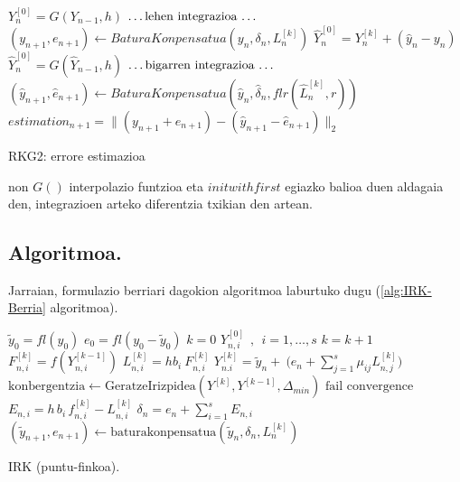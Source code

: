 \begin{algorithm}[H]
  \BlankLine
  {
    \BlankLine
    $Y_n^{[0]}=G(Y_{n-1},h)$\;
    \BlankLine
    $\text{\dots lehen integrazioa \dots}$\;
	\BlankLine
    $(y_{n+1},e_{n+1})\leftarrow BaturaKonpensatua(y_n,\delta_n,L_n^{[k]})$\;      
    \BlankLine
    \BlankLine
    {$\hat{Y}_{n}^{[0]}=Y_{n}^{[k]}+(\hat{y}_n-y_n)$\;}
    {$\hat{Y}_{n}^{[0]}=G(\hat{Y}_{n-1},h)$\;}
    \BlankLine
    $\text{\dots bigarren integrazioa \dots}$\;
	\BlankLine
    $(\hat{y}_{n+1},\hat{e}_{n+1})\leftarrow BaturaKonpensatua(\hat{y}_n,\hat{\delta}_n,flr(\hat{L}_n^{[k]},r))$\;  
    \BlankLine
    \BlankLine
    $estimation_{n+1}=\|(y_{n+1}+e_{n+1})-(\hat{y}_{n+1}-\hat{e}_{n+1})\|_2$\;
    \BlankLine
   }
 \caption{RKG2: errore estimazioa}
 \label{alg:errore-estimazioa}
\end{algorithm}
non $G()$ interpolazio funtzioa eta $initwithfirst$ egiazko balioa duen aldagaia den, integrazioen arteko diferentzia txikian den artean.

\subsection{Algoritmoa.}

Jarraian, formulazio berriari dagokion algoritmoa laburtuko dugu (\ref{alg:IRK-Berria} algoritmoa).

\begin{algorithm}[H]
 \BlankLine
  $\tilde{y}_0=fl(y_0)$\;
  $e_0=fl(y_0-\tilde{y}_0)$\;
  {
   \BlankLine
   $k=0$\;
     $Y_{n,i}^{[0]} \ \ , \ \ i=1,\dots,s $\;
   \BlankLine
   {
    \BlankLine 
    $k=k+1$\;
    $F_{n,i}^{[k]}=f(Y_{n,i}^{[k-1]}) $\;
    $L_{n,i}^{[k]}=hb_i \ F_{n,i}^{[k]} $\;
    $Y_{n.i}^{[k]}=\tilde{y}_{n} + \ \big(e_n+\sum\limits_{j=1}^{s} \mu_{ij} L_{n,j}^{[k]}\big)  $\;  
    $\text{konbergentzia} \leftarrow \text{GeratzeIrizpidea}(Y^{[k]},Y^{[k-1]},\Delta_{min}) $\;
   }
   \BlankLine
   {
   {$\text{fail convergence}$\;}
   }
   $E_{n,i} = h\,   b_i\,f_{n,i}^{[k]}-L_{n,i}^{[k]}$\;
   $\delta_{n}=e_{n}+\sum_{i=1}^{s} E_{n,i}$\;
   $(\tilde y_{n+1}, e_{n+1})\leftarrow \text{baturakonpensatua}(\tilde y_{n},\delta_{n},L_{n}^{[k]})$\;
   \BlankLine
 }
 \caption{IRK (puntu-finkoa).}
 \label{alg:IRK-Berria}
\end{algorithm}

